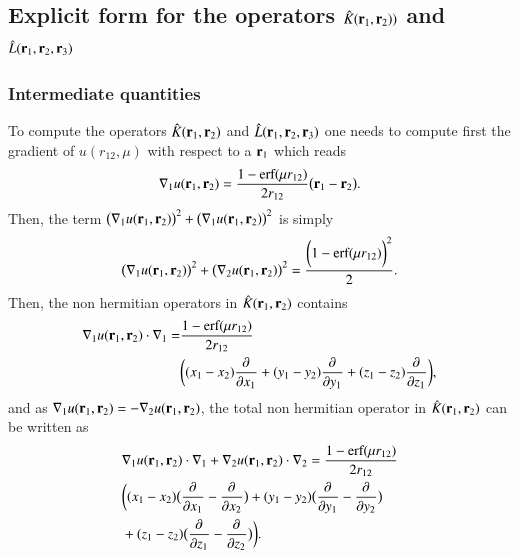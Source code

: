\documentclass[aip,jcp,reprint,noshowkeys,superscriptaddress]{revtex4-1}
\newcommand{\deriv}[3]{\frac{\partial^{#3} #1}{\partial {#2}^{#3}}}
\newcommand{\br}[0]{{\bf {r}}}
\newcommand{\bri}[1]{{\bf r}_{#1}}
\begin{document}
\subsection{Explicit form for the operators $\hat{K}(\bri{1},\bri{2}) )$ and $\hat{L}(\bri{1},\bri{2},\bri{3})$ }
\subsubsection{Intermediate quantities}
To compute the operators $\hat{K}(\bri{1},\bri{2})$ and $\hat{L}(\bri{1},\bri{2},\bri{3}) $ one needs to compute first the gradient of $u(r_{12},\mu)$ with respect to a $\bri{1}$ which reads 
\begin{equation}
 \label{eq:nabla_u}
 \begin{aligned}
 \nabla_1 u(\br{}_1,\br{}_2) = \frac{1 - \text{erf}(\mu r_{12})}{2 r_{12}} \big( \br{}_1 - \br{}_2 \big).
 \end{aligned}
\end{equation}
Then, the term $\big(\nabla_1 u(\bri{1},\bri{2}) \big) ^2 + \big(\nabla_1 u(\bri{1},\bri{2}) \big) ^2$ is simply 
\begin{equation}
 \begin{aligned}
 \big(\nabla_1 u(\bri{1},\bri{2}) \big) ^2 + \big(\nabla_2 u(\bri{1},\bri{2}) \big) ^2 = \frac{\bigg(1 - \text{erf}(\mu r_{12}) \bigg)^2}{2}.
 \end{aligned}
\end{equation}
Then, the non hermitian operators in $\hat{K}(\bri{1},\bri{2})$ contains 
\begin{equation}
 \begin{aligned}
 \nabla_1 u(\br{}_1,\br{}_2) \cdot \nabla_1  = &\frac{1 - \text{erf}(\mu r_{12})}{2 r_{12}} \\ 
                                          &\bigg( (x_1 - x_2) \deriv{}{x_1}{} + (y_1 - y_2) \deriv{}{y_1}{} + (z_1 - z_2) \deriv{}{z_1}{}\bigg),
 \end{aligned}
\end{equation}
and as $\nabla_1 u(\br{}_1,\br{}_2) = - \nabla_2 u(\br{}_1,\br{}_2)$,   
the total non hermitian operator in $\hat{K}(\bri{1},\bri{2})$ can be written as 
\begin{equation}
 \begin{aligned}
 \label{def_non_hermit}
& \nabla_1 u(\br{}_1,\br{}_2) \cdot \nabla_1 + \nabla_2 u(\br{}_1,\br{}_2) \cdot \nabla_2 = \frac{1 - \text{erf}(\mu r_{12})}{2 r_{12}} \\
& \bigg( (x_1 - x_2) \big( \deriv{}{x_1}{} - \deriv{}{x_2}{} \big) +
         (y_1 - y_2) \big( \deriv{}{y_1}{} - \deriv{}{y_2}{} \big)  \\
&  +      (z_1 - z_2) \big( \deriv{}{z_1}{} - \deriv{}{z_2}{} \big)\bigg).
 \end{aligned}
\end{equation}
\end{document}
